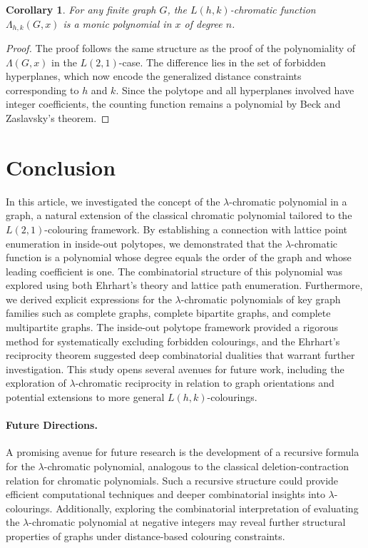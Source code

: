 \documentclass{birkjour}
\newtheorem{Corollary}[theorem]{Corollary}
\theoremstyle{definition}
\theoremstyle{remark}
\numberwithin{equation}{section}
\begin{document}
\begin{Corollary}
For any finite graph \( G \), the \( L(h,k) \)-chromatic function \( \Lambda_{h,k}(G, x) \) is a monic polynomial in \( x \) of degree \( n \).
\end{Corollary}
\begin{proof}
The proof follows the same structure as the proof of the polynomiality of \( \Lambda(G, x) \) in the \( L(2,1) \)-case. The difference lies in the set of forbidden hyperplanes, which now encode the generalized distance constraints corresponding to \( h \) and \( k \). Since the polytope and all hyperplanes involved have integer coefficients, the counting function remains a polynomial by Beck and Zaslavsky's theorem.
\end{proof}

\section*{Conclusion}
In this article, we investigated the concept of the $\lambda$-chromatic polynomial in a graph, a natural extension of the classical chromatic polynomial tailored to the $L(2,1)$-colouring framework. By establishing a connection with lattice point enumeration in inside-out polytopes, we demonstrated that the $\lambda$-chromatic function is a polynomial whose degree equals the order of the graph and whose leading coefficient is one. The combinatorial structure of this polynomial was explored using both Ehrhart's theory and lattice path enumeration. Furthermore, we derived explicit expressions for the $\lambda$-chromatic polynomials of key graph families such as complete graphs, complete bipartite graphs, and complete multipartite graphs. The inside-out polytope framework provided a rigorous method for systematically excluding forbidden colourings, and the Ehrhart's reciprocity theorem suggested deep combinatorial dualities that warrant further investigation. This study opens several avenues for future work, including the exploration of $\lambda$-chromatic reciprocity in relation to graph orientations and potential extensions to more general $L(h,k)$-colourings. \\
\paragraph{Future Directions.}
A promising avenue for future research is the development of a recursive formula for the $\lambda$-chromatic polynomial, analogous to the classical deletion-contraction relation for chromatic polynomials. Such a recursive structure could provide efficient computational techniques and deeper combinatorial insights into $\lambda$-colourings. Additionally, exploring the combinatorial interpretation of evaluating the $\lambda$-chromatic polynomial at negative integers may reveal further structural properties of graphs under distance-based colouring constraints.
\end{document}
